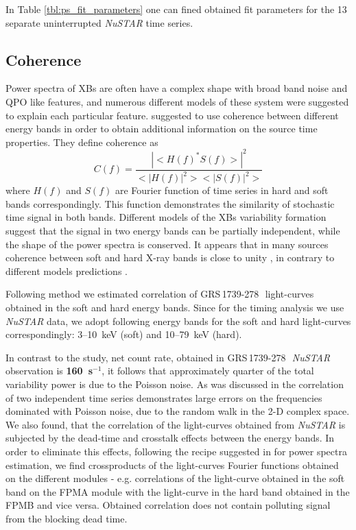 \documentclass[a4paper,fleqn,usenatbib]{mnras}
\def\grs{{GRS\,1739-278\,}}
\begin{document}
In Table \ref{tbl:ps_fit_parameters} one can fined obtained fit parameters for the 13 separate uninterrupted {\it NuSTAR} time series.

\subsection{Coherence}

    Power spectra of XBs are often have a complex shape with broad band noise and QPO like features, and numerous different models of these system were suggested to explain each particular feature. 
\citep{vaughan97} suggested to use coherence between different energy bands in order to obtain additional information on the source time properties. 
They define coherence as 
\begin{equation}
    C(f) = \frac{|<H(f)^*S(f)>|^2}{<|H(f)|^2><|S(f)|^2>}
    \label{eq:nowak_coh}
\end{equation}
where $H(f)$ and $S(f)$ are Fourier function of time series in hard and soft bands correspondingly. 
This function demonstrates the similarity of stochastic time signal in both bands. 
Different models of the XBs variability formation suggest that the signal in two energy bands can be partially independent, while the shape of the power spectra is conserved.
It appears that in many sources coherence between soft and hard X-ray bands is close to unity \citep{nowak99, wijnands01, eijden17}, in contrary to different models predictions \citep[see, discussion in][]{vaughan97}.

Following method \citep{nowak99} we estimated correlation of \grs\ light-curves obtained in the soft and hard energy bands. 
Since for the timing analysis we use {\it NuSTAR} data, we adopt following energy bands for the soft and hard light-curves correspondingly: 3--10~keV (soft) and 10--79~keV (hard).

In contrast to the \citep{nowak99} study, net count rate, obtained in \grs\ {\it NuSTAR} observation is {\bf 160~s$^{-1}$}, it follows that approximately quarter of the total variability power is due to the Poisson noise. 
As was discussed in \citep{nowak99} the correlation of two independent time series demonstrates large errors on the frequencies dominated with Poisson noise, due to the random walk in the 2-D complex space.
We also found, that the correlation of the light-curves obtained from {\it NuSTAR} is subjected by the dead-time and crosstalk effects between the energy bands.
In order to eliminate this effects, following the recipe suggested in \cite{2015ApJ...800..109B} for power spectra estimation, we find crossproducts of the light-curves Fourier functions obtained on the different modules - e.g. correlations of the light-curve obtained in the soft band on the FPMA module with the light-curve in the hard band obtained in the FPMB and vice versa.
Obtained correlation does not contain polluting signal from the blocking dead time. 
\end{document}
